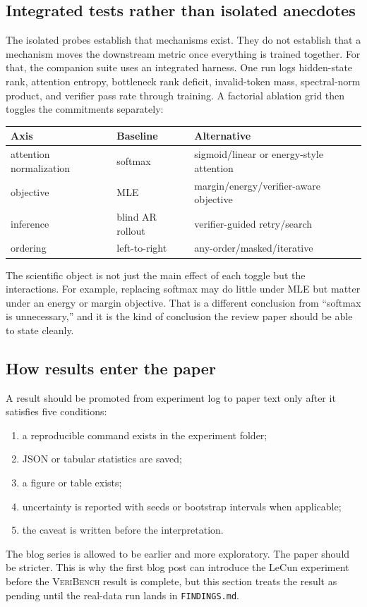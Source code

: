 \subsection{Integrated tests rather than isolated anecdotes}
\label{ssec:integrated_tests}

The isolated probes establish that mechanisms exist.
They do not establish that a mechanism moves the downstream metric once everything is trained together.
For that, the companion suite uses an integrated harness.
One run logs hidden-state rank, attention entropy, bottleneck rank deficit, invalid-token mass, spectral-norm product, and verifier pass rate through training.
A factorial ablation grid then toggles the commitments separately:
\begin{center}
\begin{tabular}{lll}
\toprule
Axis & Baseline & Alternative \\
\midrule
attention normalization & softmax & sigmoid/linear or energy-style attention \\
objective & MLE & margin/energy/verifier-aware objective \\
inference & blind AR rollout & verifier-guided retry/search \\
ordering & left-to-right & any-order/masked/iterative \\
\bottomrule
\end{tabular}
\end{center}
The scientific object is not just the main effect of each toggle but the interactions.
For example, replacing softmax may do little under MLE but matter under an energy or margin objective.
That is a different conclusion from ``softmax is unnecessary,'' and it is the kind of conclusion the review paper should be able to state cleanly.

\subsection{How results enter the paper}
\label{ssec:result_promotion}

A result should be promoted from experiment log to paper text only after it satisfies five conditions:
\begin{enumerate}[leftmargin=2em]
  \item a reproducible command exists in the experiment folder;
  \item JSON or tabular statistics are saved;
  \item a figure or table exists;
  \item uncertainty is reported with seeds or bootstrap intervals when applicable;
  \item the caveat is written before the interpretation.
\end{enumerate}
The blog series is allowed to be earlier and more exploratory.
The paper should be stricter.
This is why the first blog post can introduce the LeCun experiment before the \textsc{VeriBench} result is complete, but this section treats the result as pending until the real-data run lands in \texttt{FINDINGS.md}.
